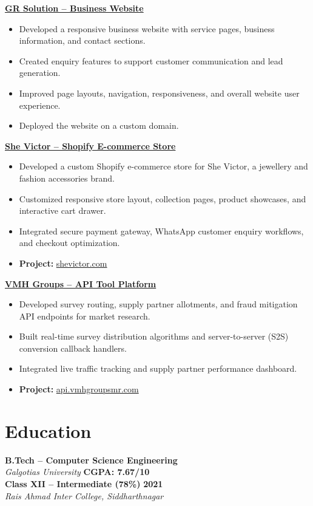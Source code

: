 \documentclass[a4paper,10pt]{article}
\begin{document}
\vspace{4pt}
\noindent \textbf{\href{https://grsolution.co.in/}{GR Solution -- Business Website}}
\begin{itemize}
    \item Developed a responsive business website with service pages, business information, and contact sections.
    \item Created enquiry features to support customer communication and lead generation.
    \item Improved page layouts, navigation, responsiveness, and overall website user experience.
    \item Deployed the website on a custom domain.
\end{itemize}

\vspace{4pt}
\noindent \textbf{\href{https://shevictor.com/}{She Victor -- Shopify E-commerce Store}}
\begin{itemize}
    \item Developed a custom Shopify e-commerce store for She Victor, a jewellery and fashion accessories brand.
    \item Customized responsive store layout, collection pages, product showcases, and interactive cart drawer.
    \item Integrated secure payment gateway, WhatsApp customer enquiry workflows, and checkout optimization.
    \item \textbf{Project:} \href{https://shevictor.com/}{shevictor.com}
\end{itemize}

\vspace{4pt}
\noindent \textbf{\href{https://api.vmhgroupsmr.com/}{VMH Groups -- API Tool Platform}}
\begin{itemize}
    \item Developed survey routing, supply partner allotments, and fraud mitigation API endpoints for market research.
    \item Built real-time survey distribution algorithms and server-to-server (S2S) conversion callback handlers.
    \item Integrated live traffic tracking and supply partner performance dashboard.
    \item \textbf{Project:} \href{https://api.vmhgroupsmr.com/}{api.vmhgroupsmr.com}
\end{itemize}

\section*{Education}
\vspace{2pt}
\noindent \textbf{B.Tech -- Computer Science Engineering} \\
\textit{Galgotias University} \hfill \textbf{CGPA: 7.67/10}\\[3pt]
\noindent \textbf{Class XII -- Intermediate (78\%)} \hfill \textbf{2021}\\
\textit{Rais Ahmad Inter College, Siddharthnagar}
\end{document}
